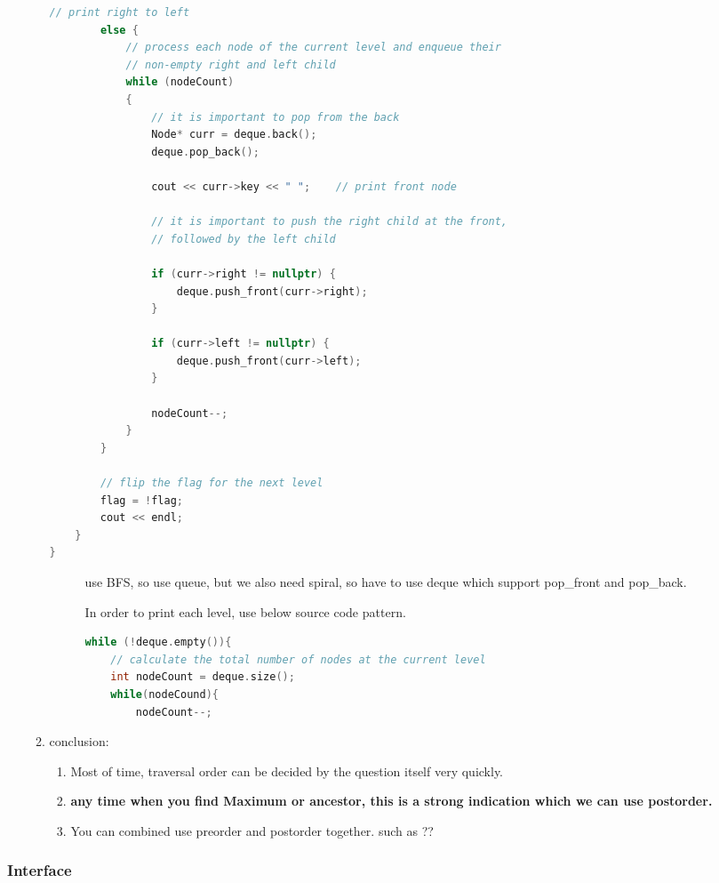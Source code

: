 \documentclass[a4paper,11pt,twoside]{book}
\begin{document}
\begin{itemize}
\begin{enumerate}
\begin{lstlisting}[frame=single, language=c++]
		// print right to left
		else {
			// process each node of the current level and enqueue their
			// non-empty right and left child
			while (nodeCount)
			{
				// it is important to pop from the back
				Node* curr = deque.back();
				deque.pop_back();
				
				cout << curr->key << " ";    // print front node
				
				// it is important to push the right child at the front,
				// followed by the left child
				
				if (curr->right != nullptr) {
					deque.push_front(curr->right);
				}
				
				if (curr->left != nullptr) {
					deque.push_front(curr->left);
				}
				
				nodeCount--;
			}
		}
		
		// flip the flag for the next level
		flag = !flag;
		cout << endl;
	}
}
\end{lstlisting}
\begin{description}
	\item[] use BFS, so use queue, but we also need spiral, so have to use deque which support pop\_front and pop\_back.
	
	\item[] In order to print each level, use below source code pattern.
\begin{lstlisting}[frame=single, language=c++]
while (!deque.empty()){
	// calculate the total number of nodes at the current level
	int nodeCount = deque.size();	
	while(nodeCound){
		nodeCount--;
\end{lstlisting}	

\end{description}


\item conclusion: 
\begin{enumerate}
	\item Most of time, traversal order can be decided by the question itself very quickly.
	\item \textbf{any time when you find Maximum or ancestor, this is a strong indication which we can use postorder.}
	\item You can combined use preorder and postorder together. such as ??
\end{enumerate}

\end{enumerate}

\end{itemize}

\subsubsection{Interface}
\end{document}
